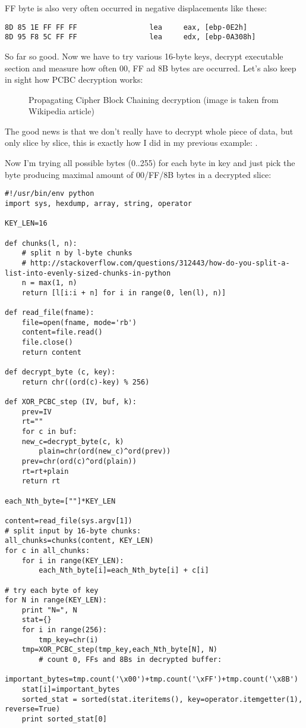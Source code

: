 FF byte is also very often occurred in negative displacements like these:

\begin{lstlisting}[style=customasmx86]
8D 85 1E FF FF FF                 lea     eax, [ebp-0E2h]
8D 95 F8 5C FF FF                 lea     edx, [ebp-0A308h]
\end{lstlisting}

So far so good. Now we have to try various 16-byte keys, decrypt executable section and measure how often 00, FF ad 8B bytes are occurred.
Let's also keep in sight how PCBC decryption works:

\begin{figure}[H]
\centering
{}
\caption{Propagating Cipher Block Chaining decryption (image is taken from Wikipedia article)}
\end{figure}

The good news is that we don't really have to decrypt whole piece of data, but only slice by slice, this is exactly how I did in my previous example: .

Now I'm trying all possible bytes (0..255) for each byte in key and just pick the byte producing maximal amount of 00/FF/8B bytes in a decrypted slice:

\begin{lstlisting}[style=custompy]
#!/usr/bin/env python
import sys, hexdump, array, string, operator

KEY_LEN=16

def chunks(l, n):
    # split n by l-byte chunks
    # http://stackoverflow.com/questions/312443/how-do-you-split-a-list-into-evenly-sized-chunks-in-python
    n = max(1, n)
    return [l[i:i + n] for i in range(0, len(l), n)]

def read_file(fname):
    file=open(fname, mode='rb')
    content=file.read()
    file.close()
    return content

def decrypt_byte (c, key):
    return chr((ord(c)-key) % 256)

def XOR_PCBC_step (IV, buf, k):
    prev=IV
    rt=""
    for c in buf:
	new_c=decrypt_byte(c, k)
        plain=chr(ord(new_c)^ord(prev))
	prev=chr(ord(c)^ord(plain))
	rt=rt+plain
    return rt

each_Nth_byte=[""]*KEY_LEN

content=read_file(sys.argv[1])
# split input by 16-byte chunks:
all_chunks=chunks(content, KEY_LEN)
for c in all_chunks:
    for i in range(KEY_LEN):
        each_Nth_byte[i]=each_Nth_byte[i] + c[i]

# try each byte of key
for N in range(KEY_LEN):
    print "N=", N
    stat={}
    for i in range(256):
        tmp_key=chr(i)
	tmp=XOR_PCBC_step(tmp_key,each_Nth_byte[N], N)
        # count 0, FFs and 8Bs in decrypted buffer:
	important_bytes=tmp.count('\x00')+tmp.count('\xFF')+tmp.count('\x8B')
	stat[i]=important_bytes
    sorted_stat = sorted(stat.iteritems(), key=operator.itemgetter(1), reverse=True)
    print sorted_stat[0]
\end{lstlisting}

